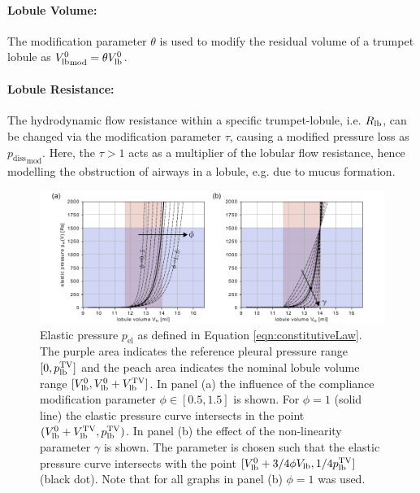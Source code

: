 \paragraph{Lobule Volume: }
The modification parameter $\theta$ is used to modify the residual volume of a trumpet lobule as ${V_{\mathrm{lb}}^0}_\mathrm{mod} = \theta V_{\mathrm{lb}}^{0}$.

\paragraph{Lobule Resistance: }
The hydrodynamic flow resistance within a specific trumpet-lobule, i.e. $R_{\mathrm{lb}}$, can be changed via the modification parameter $\tau$, causing a modified pressure loss as ${p_\mathrm{diss}}_\mathrm{mod}$.
Here, the $\tau>1$ acts as a multiplier of the lobular flow resistance, hence modelling the obstruction of airways in a lobule, e.g. due to mucus formation.
\begin{figure}[!t]
  \centering
  \includegraphics[width=1.0\textwidth]{figures/nonlinear_lobule}
  \caption{Elastic pressure $p_\mathrm{el}$ as defined in Equation \ref{eqn:constitutiveLaw}. The purple area indicates the reference pleural pressure range $[0, p_{\mathrm{lb}}^\mathrm{TV}]$ and the peach area indicates the nominal lobule volume range $[V_{\mathrm{lb}}^0, V_{\mathrm{lb}}^0+V_{\mathrm{lb}}^\mathrm{TV}]$. In panel (a) the influence of the compliance modification parameter $\phi\in[0.5, 1.5]$ is shown.
  For $\phi=1$ (solid line) the elastic pressure curve intersects in the point $(V_{\mathrm{lb}}^0 + V_{\mathrm{lb}}^\mathrm{TV}, p_{\mathrm{lb}}^\mathrm{TV})$.
  In panel (b) the effect of the non-linearity parameter $\gamma$ is shown. The parameter is chosen such that the elastic pressure curve intersects with the point $[V_{\mathrm{lb}}^0+3/4\phi V_{\mathrm{lb}}, 1/4 p_{\mathrm{lb}}^\mathrm{TV}]$ (black dot). Note that for all graphs in panel (b) $\phi=1$ was used.}
  \label{fig:nonlinearLobule}
\end{figure}




